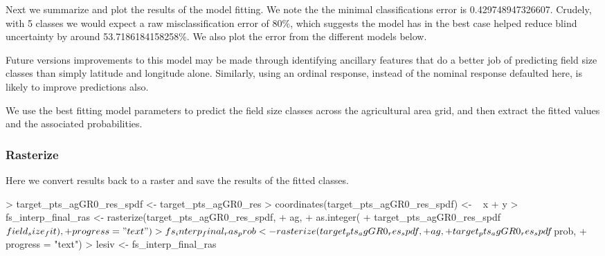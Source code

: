 \documentclass{article}
\begin{document}
Next we summarize and plot the results of the model fitting. We note the the minimal classifications error is 0.429748947326607. Crudely, with 5 classes we would expect a raw misclassification error of 80\%, which suggests the model has in the best case helped reduce blind uncertainty by around 53.7186184158258\%. We also plot the error from the different models below. 

Future versions improvements to this model may be made through identifying ancillary features that do a better job of predicting field size classes than simply latitude and longitude alone. Similarly, using an ordinal response, instead of the nominal response defaulted here, is likely to improve predictions also.


We use the best fitting model parameters to predict the field size classes across the agricultural area grid, and then extract the fitted values and the associated probabilities.
\begin{Schunk}
\end{Schunk}

\subsubsection{Rasterize}

Here we convert results back to a raster and save the results of the fitted classes.

\begin{Schunk}
\begin{Sinput}
> target_pts_agGR0_res_spdf <- target_pts_agGR0_res
> coordinates(target_pts_agGR0_res_spdf) <- ~ x + y
> fs_interp_final_ras <- rasterize(target_pts_agGR0_res_spdf,
+                                  ag,
+                                  as.integer(
+                                  target_pts_agGR0_res_spdf$field_size_fit),
+                                  progress = "text")
> fs_interp_final_ras_prob <- rasterize(target_pts_agGR0_res_spdf,
+                                       ag,
+                                       target_pts_agGR0_res_spdf$prob,
+                                       progress = "text")
> lesiv <- fs_interp_final_ras
\end{Sinput}
\end{Schunk}
\end{document}
